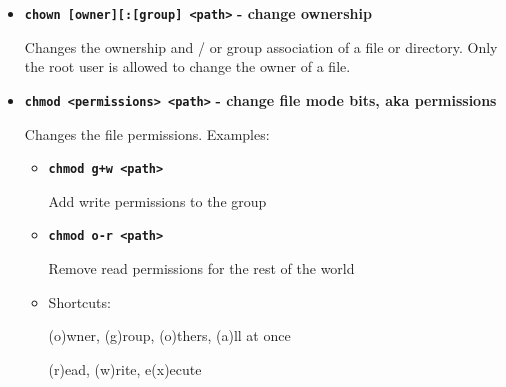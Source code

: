 \documentclass[aspectratio=1610]{beamer}
\newcommand\curtitle{}
\newenvironment{shells}[1]{
    \begin{tikzpicture}[codebox/.append style={text width=#1-18pt}]
        \coordinate (code);
}{
    \end{tikzpicture}
}
\newcommand\command[1]{\alert{\textbf{\texttt{#1}}}}
\begin{document}

\begin{frame}[c]{\curtitle}
    \begin{itemize}[<+->]\setlength\itemsep{1em}
        \item \command{chown [owner][:[group] <path>} \textbf{- change ownership} 


            Changes the ownership and / or group association of a file or directory. Only the
            \alert{root} user is allowed to change the owner of a file.

        \item \command{chmod <permissions> <path>} \textbf{- change file mode bits, aka permissions} 

            Changes the file permissions. Examples:
            \begin{itemize}[<.->]
                \item \command{chmod g+w <path>}

                    Add write permissions to the group
                \item \command{chmod o-r <path>}

                    Remove read permissions for the rest of the world
                \item Shortcuts:

                    (o)wner, (g)roup, (o)thers, (a)ll at once

                    (r)ead, (w)rite, e(x)ecute
            \end{itemize}
    \end{itemize}
\end{frame}


\end{document}
